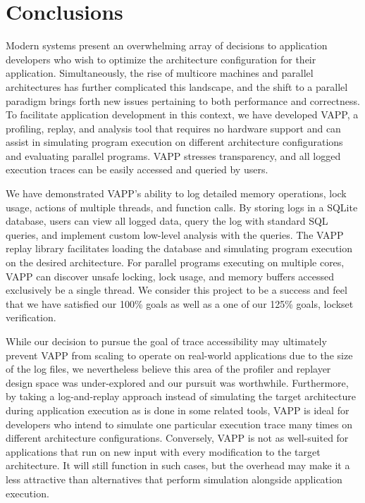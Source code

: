 \section{Conclusions}
Modern systems present an overwhelming array of decisions to
application developers who wish to optimize the architecture 
configuration for their application.  Simultaneously, the
rise of multicore machines and parallel architectures has
further complicated this landscape, and the shift to a parallel
paradigm brings forth new issues pertaining to both performance
and correctness.  To facilitate application development in this
context, we have developed VAPP, a profiling, replay, and analysis tool that 
requires no hardware support and can assist in simulating
program execution on different architecture configurations and
evaluating parallel programs.  VAPP stresses transparency, and
all logged execution traces can be easily accessed and queried
by users.

We have demonstrated VAPP's ability to log detailed memory operations,
lock usage, actions of multiple threads, and function calls.  By
storing logs in a SQLite database, users can view all logged data,
query the log with standard SQL queries, and implement custom
low-level analysis with the queries.  The VAPP replay library
facilitates loading the database and simulating program execution
on the desired architecture.  For parallel programs executing on multiple
cores, VAPP can discover unsafe locking, lock usage, and memory
buffers accessed exclusively be a single thread.  We consider this
project to be a success and feel that we have satisfied our 100\%
goals as well as a one of our 125\% goals, lockset verification.

While our decision to pursue the goal of trace accessibility may
ultimately prevent VAPP from scaling to operate on real-world
applications due to the size of the log files, we nevertheless
believe this area of the profiler and replayer
design space was under-explored and our pursuit was worthwhile.
Furthermore, by taking a log-and-replay approach instead of
simulating the target architecture during application execution
as is done in some related tools, VAPP is ideal for developers
who intend to simulate one particular execution trace many
times on different architecture configurations.  Conversely,
VAPP is not as well-suited for applications that run on new
input with every modification to the target architecture.  It will
still function in such cases, but the overhead may make it a less
attractive than alternatives that perform simulation alongside
application execution.

